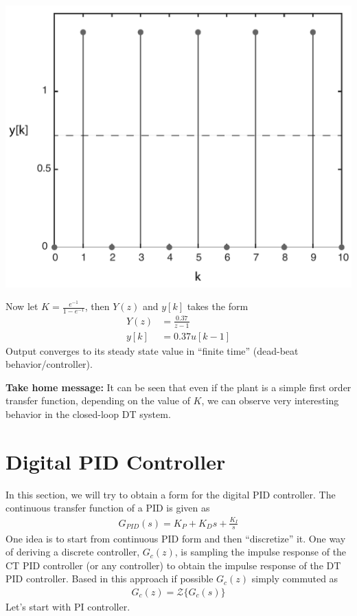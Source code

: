 \documentclass[twoside]{article}
\begin{document}
    \begin{center}
\begin{minipage}[h]{0.5\linewidth}
    \begin{center}
      \includegraphics[width=\textwidth]{oscillate}
    \end{center}
\end{minipage}
    \end{center}
%
Now let $K = \frac{e^{-1}}{1-e^{-1}}$, then $Y(z)$ and $y[k]$
takes the form
%
\begin{align*}
Y(z) &= \frac{0.37}{z-1} 
\\
y[k] &= 0.37 u[k-1]
\end{align*}
%
Output converges to its steady state value in ``finite time''
(dead-beat behavior/controller). 

\textbf{Take home message:} It can be seen that even if the plant is
a simple first order transfer function, depending on the value of $K$,
we can observe very interesting behavior in the closed-loop DT system.

\newpage 

\section{Digital PID Controller}

In this section, we will try to obtain a form for the digital PID
controller. The continuous transfer function of a PID is given as
%
\begin{align*}
G_{PID}(s) = K_P + K_D s + \frac{K_I}{s}
\end{align*}
% 
One idea is to start from continuous PID form and then ``discretize''
it. One way of deriving a discrete controller, $G_{c}(z)$, is sampling 
the impulse response of the CT PID controller (or any controller) 
to obtain the impulse response of the DT PID controller.
Based in this approach if possible $G_c(z)$ simply commuted as
%
\begin{align*}
  G_c(z) = \mathcal{Z} \lbrace G_c(s) \rbrace
\end{align*}
%
Let's start with PI controller. 
\end{document}
